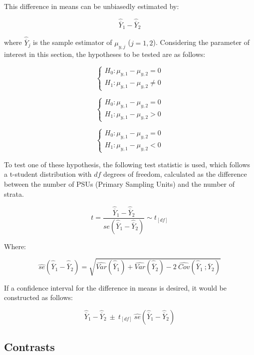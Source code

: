 \documentclass[
  12pt,
]{book}
\begin{document}
This difference in means can be unbiasedly estimated by:

\[
\widehat{\overline{Y}}_{1} - \widehat{\overline{Y}}_{2}
\]

where \(\widehat{\overline{Y}}_{j}\) is the sample estimator of \(\mu_{y,j}\) (\(j = 1, 2\)). Considering the parameter of interest in this section, the hypotheses to be tested are as follows:

\[
\begin{cases}
H_0: \mu_{y,1} - \mu_{y,2} = 0 \\
H_1: \mu_{y,1} - \mu_{y,2} \neq 0
\end{cases} 
\]

\[
\begin{cases}
H_0: \mu_{y,1} - \mu_{y,2} = 0 \\
H_1: \mu_{y,1} - \mu_{y,2} > 0
\end{cases}
\]

\[
\begin{cases}
H_0: \mu_{y,1} - \mu_{y,2} = 0 \\
H_1: \mu_{y,1} - \mu_{y,2} < 0
\end{cases}
\]

To test one of these hypothesis, the following test statistic is used, which follows a t-student distribution with \(df\) degrees of freedom, calculated as the difference between the number of PSUs (Primary Sampling Units) and the number of strata.

\[
t = \frac{\widehat{\overline{Y}}_{1} - \widehat{\overline{Y}}_{2}} {se\left(\widehat{\overline{Y}}_{1} - \widehat{\overline{Y}}_{2}\right)} \sim t_{[df]}
\]

Where:

\[
\widehat{se} \left( \widehat{\overline{Y}}_{1} - \widehat{\overline{Y}}_{2} \right) = \sqrt{\widehat{Var}\left(\widehat{\overline{Y}}_{1}\right) + \widehat{Var}\left(\widehat{\overline{Y}}_{2}\right) - 2 \  \widehat{Cov}\left(\widehat{\overline{Y}}_{1} \ ; \widehat{\overline{Y}}_{2} \right)}
\]

If a confidence interval for the difference in means is desired, it would be constructed as follows:

\[
\widehat{\overline{Y}}_{1} - \widehat{\overline{Y}}_{2} \ \pm \ t_{[df]} \ \widehat{se}\left( \widehat{\overline{Y}}_{1} - \widehat{\overline{Y}}_{2} \right)
\]

\hypertarget{contrasts}{%
\subsection{Contrasts}\label{contrasts}}
\end{document}
